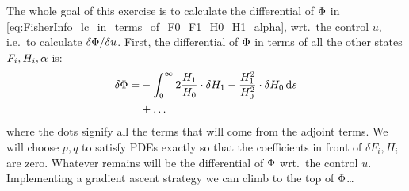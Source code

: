 \documentclass{article}
\begin{document}
% 
% 


\vskip10pt The whole goal of this exercise is to calculate the differential of
${\Phi}$ in \cref{eq:FisherInfo_lc_in_terms_of_F0_F1_H0_H1_alpha}, wrt.\ the
control $u$, i.e.\ to calculate $\delta {\Phi}  / \delta u$. First, the
differential of ${\Phi}$ in terms of all the other states $F_i, H_i, {\alpha}$ is:
\begin{align*}
\delta {\Phi} =& -\int_0^{\infty} 2 \frac{H_1}{H_0} \cdot \delta H_1
- \frac{H^2_1}{H^2_0} \cdot \delta H_0
\, \mathrm{d} s
  \\
& + \ldots
\end{align*}
where the dots signify all the terms that will come from the adjoint terms. We
will choose $p,q$ to satisfy PDEs exactly so that the coefficients in front of
$\delta F_i, H_i$ are zero. Whatever remains will be the differential of
${\Phi}$ wrt.\ the control $u$. Implementing a gradient ascent strategy we can
climb to the top of ${\Phi}$\ldots
 
\end{document}
